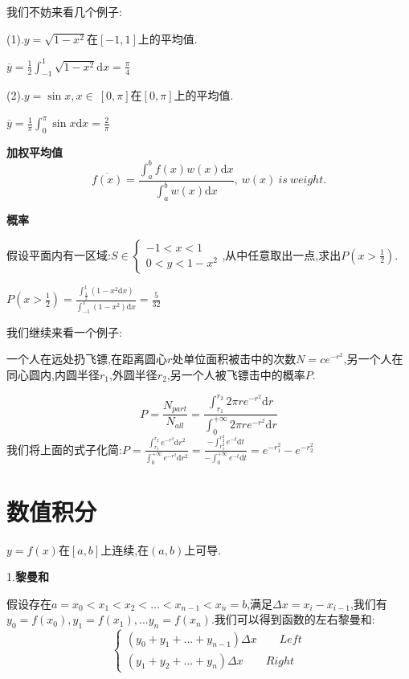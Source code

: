 \documentclass[oneside]{book}
\begin{document}
	我们不妨来看几个例子:
	
	(1).$y=\sqrt{1-x^{2}}$在$[-1,1]$上的平均值.
	
	$\overline{y}=\frac{1}{2}\int_{-1}^{1}\sqrt{1-x^{2}}\mathrm{d}x=\frac{\pi}{4}$
	
	(2).$y=\sin x,x\in \ [0,\pi]$在$[0,\pi]$上的平均值.
	
	$\overline{y}=\frac{1}{\pi}\int_{0}^{\pi}\sin x\mathrm{d}x=\frac{2}{\pi}$
	
	\textbf{加权平均值}
	$$\overline{f(x)}=\frac{\int_{a}^{b}f(x)w(x)\mathrm{d}x}{\int_{a}^{b}w(x)\mathrm{d}x},\ w(x)\ is \ weight.$$
	
	\textbf{概率}
	
	假设平面内有一区域:$S\in \left\{\begin{array}{c}
		-1<x<1\\0<y<1-x^{2}
	\end{array}\right.$,从中任意取出一点,求出$P(x>\frac{1}{2})$.

	$P(x>\frac{1}{2})=\frac{\int_{\frac{1}{2}}^{1}(1-x^{2}\mathrm{d}x)}{\int_{-1}^{1}(1-x^{2})\mathrm{d}x}=\frac{5}{32}$
	
	我们继续来看一个例子:
	
	一个人在远处扔飞镖,在距离圆心$r$处单位面积被击中的次数$N=ce^{-r^{2}}$,另一个人在同心圆内,内圆半径$r_{1}$,外圆半径$r_{2}$,另一个人被飞镖击中的概率$P$.
	
	$$P=\frac{N_{part}}{N_{all}}=\frac{\int_{r_{1}}^{r_{2}}2\pi re^{-r^{2}}\mathrm{d}r}{\int_{0}^{+\infty}2\pi re^{-r^{2}}\mathrm{d}r}$$
	我们将上面的式子化简:$P=\frac{\int_{r_{1}}^{r_{2}} e^{-r^{2}}\mathrm{d}r^{2}}{\int_{0}^{+\infty}e^{-r^{2}}\mathrm{d}r^{2}}=\frac{-\int_{r_{1}^{2}}^{r_{2}^{2}}e^{-t}\mathrm{d}t}{-\int_{0}^{+\infty}e^{-t}\mathrm{d}t}=e^{-r_{1}^{2}}-e^{-r_{2}^{2}}$
	\chapter{数值积分}
	$y=f(x)$在$[a,b]$上连续,在$(a,b)$上可导.
	
	1.\textbf{黎曼和}
	
	假设存在$a=x_{0}<x_{1}<x_{2}<...<x_{n-1}<x_{n}=b$,满足$\Delta x=x_{i}-x_{i-1}$,我们有$y_{0}=f(x_{0}),y_{1}=f(x_{1}),...y_{n}=f(x_{n})$.我们可以得到函数的左右黎曼和:
	$$\left\{\begin{array}{c}
		(y_{0}+y_{1}+...+y_{n-1})\Delta x \qquad Left\\(y_{1}+y_{2}+...+y_{n})\Delta x \qquad Right
	\end{array}\right.$$
\end{document}
